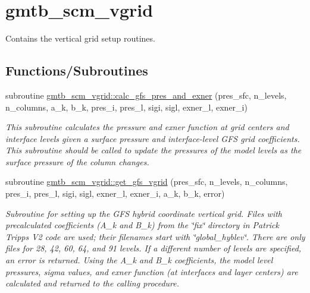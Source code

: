 \hypertarget{group__vgrid}{}\section{gmtb\+\_\+scm\+\_\+vgrid}
\label{group__vgrid}


Contains the vertical grid setup routines.  


\subsection*{Functions/\+Subroutines}
\begin{DoxyCompactItemize}
\item 
subroutine \hyperlink{group__vgrid_ga20af2c87714fbaa962ec9be7fae493d2}{gmtb\+\_\+scm\+\_\+vgrid\+::calc\+\_\+gfs\+\_\+pres\+\_\+and\+\_\+exner} (pres\+\_\+sfc, n\+\_\+levels, n\+\_\+columns, a\+\_\+k, b\+\_\+k, pres\+\_\+i, pres\+\_\+l, sigi, sigl, exner\+\_\+l, exner\+\_\+i)
\begin{DoxyCompactList}\small\item\em This subroutine calculates the pressure and exner function at grid centers and interface levels given a surface pressure and interface-\/level G\+FS grid coefficients. This subroutine should be called to update the pressures of the model levels as the surface pressure of the column changes. \end{DoxyCompactList}\end{DoxyCompactItemize}
\begin{DoxyCompactItemize}
\item 
subroutine \hyperlink{group__vgrid_ga1086e1f828a0bafa38299bdc17fde6fe}{gmtb\+\_\+scm\+\_\+vgrid\+::get\+\_\+gfs\+\_\+vgrid} (pres\+\_\+sfc, n\+\_\+levels, n\+\_\+columns, pres\+\_\+i, pres\+\_\+l, sigi, sigl, exner\+\_\+l, exner\+\_\+i, a\+\_\+k, b\+\_\+k, error)
\begin{DoxyCompactList}\small\item\em Subroutine for setting up the G\+FS hybrid coordinate vertical grid. Files with precalculated coefficients (A\+\_\+k and B\+\_\+k) from the \char`\"{}fix\char`\"{} directory in Patrick Tripp\textquotesingle{}s V2 code are used; their filenames start with \char`\"{}global\+\_\+hyblev\char`\"{}. There are only files for 28, 42, 60, 64, and 91 levels. If a different number of levels are specified, an error is returned. Using the A\+\_\+k and B\+\_\+k coefficients, the model level pressures, sigma values, and exner function (at interfaces and layer centers) are calculated and returned to the calling procedure. \end{DoxyCompactList}\end{DoxyCompactItemize}


